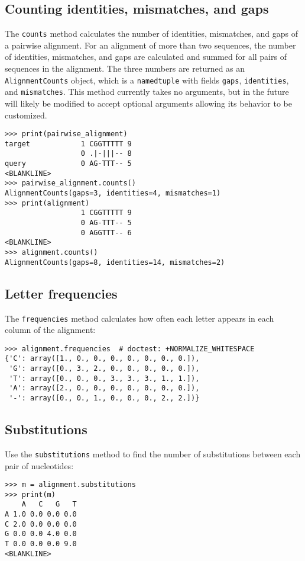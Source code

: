 \subsection{Counting identities, mismatches, and gaps}

The \verb|counts| method calculates the number of identities, mismatches, and gaps of a pairwise alignment.
For an alignment of more than two sequences, the number of identities, mismatches, and gaps are calculated and summed for all pairs of sequences in the alignment. The three numbers are returned as an \verb|AlignmentCounts| object, which is a \verb|namedtuple| with fields \verb|gaps|, \verb|identities|, and \verb|mismatches|. This method currently takes no arguments, but in the future will likely be modified to accept optional arguments allowing its behavior to be customized.
\begin{verbatim}
>>> print(pairwise_alignment)
target            1 CGGTTTTT 9
                  0 .|-|||-- 8
query             0 AG-TTT-- 5
<BLANKLINE>
>>> pairwise_alignment.counts()
AlignmentCounts(gaps=3, identities=4, mismatches=1)
>>> print(alignment)
                  1 CGGTTTTT 9
                  0 AG-TTT-- 5
                  0 AGGTTT-- 6
<BLANKLINE>
>>> alignment.counts()
AlignmentCounts(gaps=8, identities=14, mismatches=2)
\end{verbatim}

\subsection{Letter frequencies}

The \verb+frequencies+ method calculates how often each letter appears in each column of the alignment:
\begin{verbatim}
>>> alignment.frequencies  # doctest: +NORMALIZE_WHITESPACE
{'C': array([1., 0., 0., 0., 0., 0., 0., 0.]),
 'G': array([0., 3., 2., 0., 0., 0., 0., 0.]),
 'T': array([0., 0., 0., 3., 3., 3., 1., 1.]),
 'A': array([2., 0., 0., 0., 0., 0., 0., 0.]),
 '-': array([0., 0., 1., 0., 0., 0., 2., 2.])}
\end{verbatim}

\subsection{Substitutions}

Use the \verb+substitutions+ method to find the number of substitutions between each pair of nucleotides:
\begin{verbatim}
>>> m = alignment.substitutions
>>> print(m)
    A   C   G   T
A 1.0 0.0 0.0 0.0
C 2.0 0.0 0.0 0.0
G 0.0 0.0 4.0 0.0
T 0.0 0.0 0.0 9.0
<BLANKLINE>
\end{verbatim}

